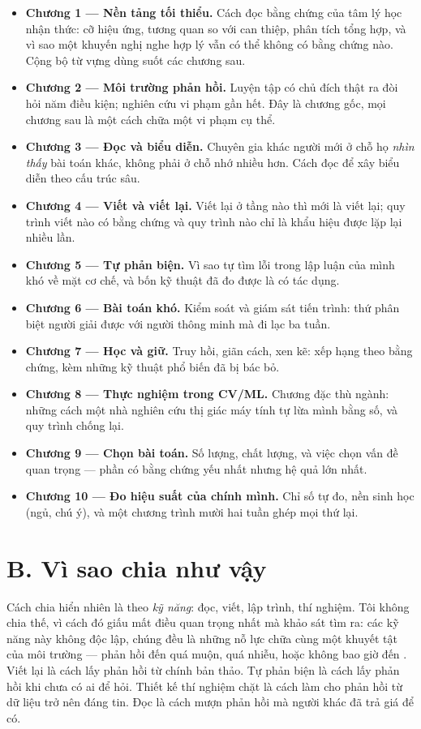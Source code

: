 \documentclass[hieu-suat.tex]{subfiles}
\begin{document}
\begin{itemize}
\item \textbf{Chương 1 --- Nền tảng tối thiểu.} Cách đọc bằng chứng của tâm lý học nhận thức: cỡ hiệu ứng, tương quan so với can thiệp, phân tích tổng hợp, và vì sao một khuyến nghị nghe hợp lý vẫn có thể không có bằng chứng nào. Cộng bộ từ vựng dùng suốt các chương sau.
\item \textbf{Chương 2 --- Môi trường phản hồi.} Luyện tập có chủ đích thật ra đòi hỏi năm điều kiện; nghiên cứu vi phạm gần hết. Đây là chương gốc, mọi chương sau là một cách chữa một vi phạm cụ thể.
\item \textbf{Chương 3 --- Đọc và biểu diễn.} Chuyên gia khác người mới ở chỗ họ \emph{nhìn thấy} bài toán khác, không phải ở chỗ nhớ nhiều hơn. Cách đọc để xây biểu diễn theo cấu trúc sâu.
\item \textbf{Chương 4 --- Viết và viết lại.} Viết lại ở tầng nào thì mới là viết lại; quy trình viết nào có bằng chứng và quy trình nào chỉ là khẩu hiệu được lặp lại nhiều lần.
\item \textbf{Chương 5 --- Tự phản biện.} Vì sao tự tìm lỗi trong lập luận của mình khó về mặt cơ chế, và bốn kỹ thuật đã đo được là có tác dụng.
\item \textbf{Chương 6 --- Bài toán khó.} Kiểm soát và giám sát tiến trình: thứ phân biệt người giải được với người thông minh mà đi lạc ba tuần.
\item \textbf{Chương 7 --- Học và giữ.} Truy hồi, giãn cách, xen kẽ: xếp hạng theo bằng chứng, kèm những kỹ thuật phổ biến đã bị bác bỏ.
\item \textbf{Chương 8 --- Thực nghiệm trong CV/ML.} Chương đặc thù ngành: những cách một nhà nghiên cứu thị giác máy tính tự lừa mình bằng số, và quy trình chống lại.
\item \textbf{Chương 9 --- Chọn bài toán.} Số lượng, chất lượng, và việc chọn vấn đề quan trọng --- phần có bằng chứng yếu nhất nhưng hệ quả lớn nhất.
\item \textbf{Chương 10 --- Đo hiệu suất của chính mình.} Chỉ số tự đo, nền sinh học (ngủ, chú ý), và một chương trình mười hai tuần ghép mọi thứ lại.
\end{itemize}

\section*{B. Vì sao chia như vậy}

Cách chia hiển nhiên là theo \emph{kỹ năng}: đọc, viết, lập trình, thí nghiệm. Tôi không chia thế, vì cách đó giấu mất điều quan trọng nhất mà khảo sát tìm ra: các kỹ năng này không độc lập, chúng đều là những nỗ lực chữa cùng một khuyết tật của môi trường --- phản hồi đến quá muộn, quá nhiễu, hoặc không bao giờ đến \cite{hogarth2015}. Viết lại là cách lấy phản hồi từ chính bản thảo. Tự phản biện là cách lấy phản hồi khi chưa có ai để hỏi. Thiết kế thí nghiệm chặt là cách làm cho phản hồi từ dữ liệu trở nên đáng tin. Đọc là cách mượn phản hồi mà người khác đã trả giá để có.
\end{document}
